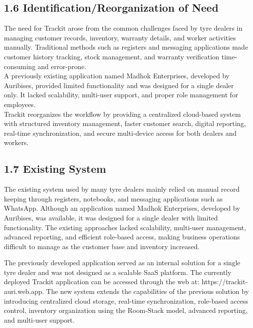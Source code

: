 \documentclass[12pt, oneside]{article}
\begin{document}
\subsection*{1.6 Identification/Reorganization of Need}
The need for Trackit arose from the common challenges faced by tyre dealers in managing customer records, inventory, warranty details, and worker activities manually. Traditional methods such as registers and messaging applications made customer history tracking, stock management, and warranty verification time-consuming and error-prone.\\[0.25cm]
A previously existing application named Madhok Enterprises, developed by Auribises, provided limited functionality and was designed for a single dealer only. It lacked scalability, multi-user support, and proper role management for employees.\\[0.25cm]
Trackit reorganizes the workflow by providing a centralized cloud-based system with structured inventory management, faster customer search, digital reporting, real-time synchronization, and secure multi-device access for both dealers and workers.
\subsection*{1.7 Existing System}
The existing system used by many tyre dealers mainly relied on manual record keeping through registers, notebooks, and messaging applications such as WhatsApp. Although an application named Madhok Enterprises, developed by Auribises, was available, it was designed for a single dealer with limited functionality. The existing approaches lacked scalability, multi-user management, advanced reporting, and efficient role-based access, making business operations difficult to manage as the customer base and inventory increased.

The previously developed application served as an internal solution for a single tyre dealer and was not designed as a scalable SaaS platform. The currently deployed Trackit application can be accessed through the web at: https://trackit-auri.web.app. The new system extends the capabilities of the previous solution by introducing centralized cloud storage, real-time synchronization, role-based access control, inventory organization using the Room-Stack model, advanced reporting, and multi-user support.
\end{document}
